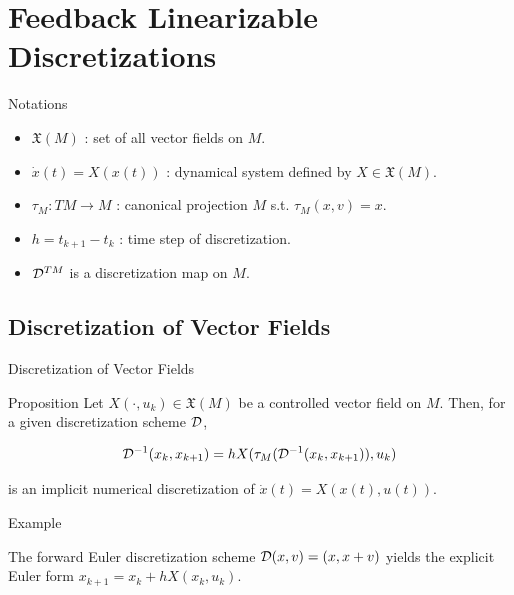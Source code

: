 \documentclass{beamer}
\begin{document}
\section{Feedback Linearizable Discretizations}

\begin{frame}{Notations}

  \begin{itemize}
    \item $\mathfrak{X}(M)$ : set of all vector fields on $M$. 
    \item $\dot{x}(t) = X(x(t))$ : dynamical system defined by $X \in \mathfrak{X}(M)$.
    \item $\tau_M : TM \longrightarrow M$ : canonical projection $M$ s.t. $\tau_M(x,v) = x$.
    \item $h = t_{k+1} - t_k$ : time step of discretization.
    \item $\mathcal{D}^{TM}$ is a discretization map on $M$.
  \end{itemize}
  
\end{frame}

\subsection{Discretization of Vector Fields}
\begin{frame}{Discretization of Vector Fields}
  \begin{block}{Proposition}
    Let $X(\cdot, u_k) \in \mathfrak{X}(M)$ be a controlled vector field on $M$. Then, for a given discretization scheme $\mathcal{D}$,

    \[
      \mathcal{D}^{-1}(x_k, x_{k+1}) = hX(\tau_M(\mathcal{D}^{-1}(x_k, x_{k+1})), u_k)
    \]

    is an implicit numerical discretization of $\dot{x}(t) = X(x(t), u(t))$.
  \end{block}


  \begin{block}{Example}

    The forward Euler discretization scheme $\mathcal{D}(x,v) = (x, x + v)$ yields the explicit Euler form $x_{k+1} = x_k + hX(x_k, u_k)$.
    
  \end{block}
  
\end{frame}
\end{document}

